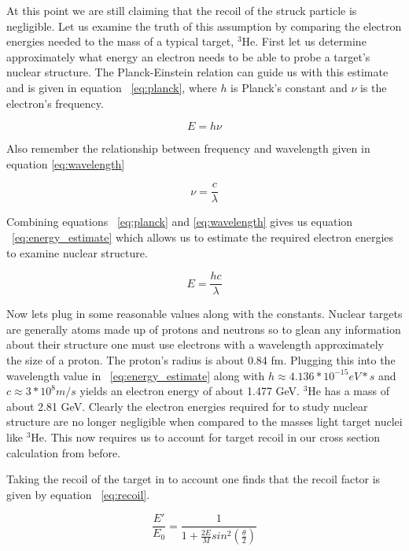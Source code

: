 At this point we are still claiming that the recoil of the struck particle is negligible. Let us examine the truth of this assumption by comparing the electron energies needed to the mass of a typical target, $^3$He. First let us determine approximately what energy an electron needs to be able to probe a target's nuclear structure. The Planck-Einstein relation can guide us with this estimate and is given in equation ~\ref{eq:planck}, where $h$ is Planck's constant and $\nu$ is the electron's frequency. 

\begin{equation} \label{eq:planck}
	E = h\nu
\end{equation}

\noindent Also remember the relationship between frequency and wavelength given in equation \ref{eq:wavelength}

\begin{equation} \label{eq:wavelength}
	\nu = \frac{c}{\lambda}
\end{equation}

\noindent Combining equations ~\ref{eq:planck} and \ref{eq:wavelength} gives us equation ~\ref{eq:energy_estimate} which allows us to estimate the required electron energies to examine nuclear structure. 

\begin{equation} \label{eq:energy_estimate}
	E = \frac{hc}{\lambda}
\end{equation}

Now lets plug in some reasonable values along with the constants. Nuclear targets are generally atoms made up of protons and neutrons so to glean any information about their structure one must use electrons with a wavelength approximately the size of a proton. The proton's radius is about 0.84 fm. Plugging this into the wavelength value in ~\ref{eq:energy_estimate} along with $h \approx 4.136 *10^{-15} eV*s$ and $c\approx 3*10^{8} m/s$ yields an electron energy of about 1.477 GeV. $^3$He has a mass of about 2.81 GeV. Clearly the electron energies required for to study nuclear structure are no longer negligible when compared to the masses light target nuclei like $^3$He. This now requires us to account for target recoil in our cross section calculation from before.

Taking the recoil of the target in to account one finds that the recoil factor is given by equation ~\ref{eq:recoil}. 

\begin{equation} \label{eq:recoil}
\frac{E'}{E_0} = \frac{1}{1+\frac{2E}{M} sin^2 \left( \frac{\theta}{2} \right)}
\end{equation}

